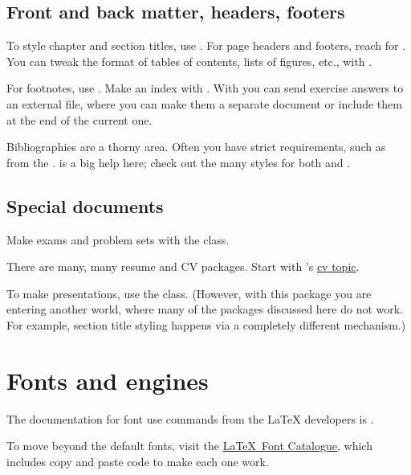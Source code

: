 \documentclass[11pt]{article}
\begin{document}
\begin{multicols*}{2}
\subsection{Front and back matter, headers, footers}
To style chapter and section titles, use
.
For page headers and footers, reach for 
.
You can tweak the format of tables of contents, lists of figures, etc., 
with
.

For footnotes, use 
.
Make an index with 
.
With 
you can send exercise answers to an external file, where you can make them
a separate document or include them at the end of the current one. 

Bibliographies are a thorny area.
Often you have strict requirements, such as from the
.
\CTAN{} is a big help here; check out the many styles for both
\href{https://ctan.org/topic/bibtex-sty}{\BibTeX}
and
\href{https://ctan.org/topic/biblatex}{\BibLaTeX}.




\subsection{Special documents}
Make exams and problem sets with the 
class.

There are many, many resume and CV packages.
Start with 's
\href{https://ctan.org/topic/cv}{cv topic}.

To make presentations, use the 
class.
(However, with this package you are entering another world, where many of the
packages discussed here do not work.
For example, section title styling happens via a completely
different mechanism.)


\section{Fonts and engines}
The documentation for font use commands from the \LaTeX{} developers is 
\href{http://mirror.ctan.org/macros/latex/base/fntguide.pdf}
 {}.

To move beyond the default fonts, 
visit the 
\href{https://tug.org/FontCatalogue/}{\LaTeX\ Font Catalogue},
which includes copy and paste code to make each one work.


\end{multicols*}
\end{document}
